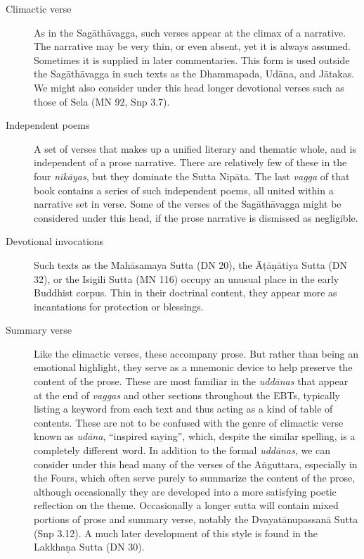 \documentclass[12pt,openany]{book}%
\begin{document}
\begin{description}%
\item[Climactic verse] As in the \textsanskrit{Sagāthāvagga}, such verses appear at the climax of a narrative. The narrative may be very thin, or even absent, yet it is always assumed. Sometimes it is supplied in later commentaries. This form is used outside the \textsanskrit{Sagāthāvagga} in such texts as the Dhammapada, \textsanskrit{Udāna}, and \textsanskrit{Jātakas}. We might also consider under this head longer devotional verses such as those of Sela (MN 92, Snp 3.7).%
\item[Independent poems] A set of verses that makes up a unified literary and thematic whole, and is independent of a prose narrative. There are relatively few of these in the four \textit{\textsanskrit{nikāyas}}, but they dominate the Sutta \textsanskrit{Nipāta}. The last \textit{vagga} of that book contains a series of such independent poems, all united within a narrative set in verse. Some of the verses of the \textsanskrit{Sagāthāvagga} might be considered under this head, if the prose narrative is dismissed as negligible.%
\item[Devotional invocations] Such texts as the \textsanskrit{Mahāsamaya} Sutta (DN 20), the \textsanskrit{Āṭāṇātiya} Sutta (DN 32), or the Isigili Sutta (MN 116) occupy an unusual place in the early Buddhist corpus. Thin in their doctrinal content, they appear more as incantations for protection or blessings.%
\item[Summary verse] Like the climactic verses, these accompany prose. But rather than being an emotional highlight, they serve as a mnemonic device to help preserve the content of the prose. These are most familiar in the \textit{\textsanskrit{uddānas}} that appear at the end of \textit{vaggas} and other sections throughout the EBTs, typically listing a keyword from each text and thus acting as a kind of table of contents. These are not to be confused with the genre of climactic verse known as \textit{\textsanskrit{udāna}}, “inspired saying”, which, despite the similar spelling, is a completely different word. In addition to the formal \textit{\textsanskrit{uddānas}}, we can consider under this head many of the verses of the \textsanskrit{Aṅguttara}, especially in the Fours, which often serve purely to summarize the content of the prose, although occasionally they are developed into a more satisfying poetic reflection on the theme. Occasionally a longer sutta will contain mixed portions of prose and summary verse, notably the \textsanskrit{Dvayatānupassanā} Sutta (Snp 3.12). A much later development of this style is found in the \textsanskrit{Lakkhaṇa} Sutta (DN 30).%
\end{description}
\end{document}
